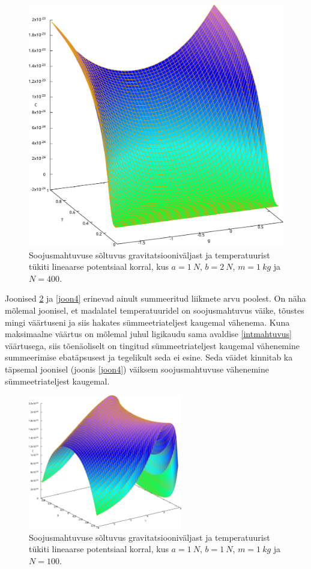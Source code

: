 \documentclass{trkut}%
\begin{document}
\begin{figure}[htb!]
    \includegraphics[width=\textwidth]{maxima/m1a1b2T0_1S400.pdf}
    \caption{Soojusmahtuvuse sõltuvus gravitatsiooniväljast ja temperatuurist tükiti lineaarse potentsiaal korral, kus $a=\SI{1}{N}$, $b=\SI{2}{N}$, $m=\SI{1}{kg}$ ja $N=400$.}
    \label{joon5}
\end{figure}

Joonised \ref{joon3} ja \ref{joon4} erinevad ainult summeeritud liikmete arvu poolest.
On näha mõlemal joonisel, et madalatel temperatuuridel on soojusmahtuvus väike, tõustes mingi väärtuseni ja siis hakates sümmeetriateljest kaugemal vähenema.
Kuna maksimaalne väärtus on mõlemal juhul ligikaudu sama avaldise \eqref{intmahtuvus} väärtusega, siis tõenäoliselt on tingitud sümmeetriateljest kaugemal vähenemine summeerimise ebatäpsusest ja tegelikult seda ei esine.
Seda väidet kinnitab ka täpsemal joonisel (joonis \ref{joon4}) väiksem soojusmahtuvuse vähenemine sümmeetriateljest kaugemal.

\begin{figure}[htb!]
    \includegraphics[width=0.6\textwidth]{maxima/m1a1b1T0_10S100.pdf}
    \caption{Soojusmahtuvuse sõltuvus gravitatsiooniväljast ja temperatuurist tükiti lineaarse potentsiaal korral, kus $a=\SI{1}{N}$, $b=\SI{1}{N}$, $m=\SI{1}{kg}$ ja $N=100$.}
    \label{joon3}
\end{figure}
\end{document}
